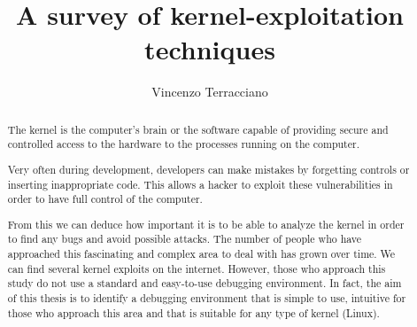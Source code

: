 \documentclass{masterthesis}
\begin{document}
\title{A survey of kernel-exploitation techniques}

\author{Vincenzo Terracciano}



\maketitle

\begin{abstract}
The kernel is the computer’s brain or the software capable of providing secure and controlled access to the hardware to the processes running on the computer.

Very often during development, developers can make mistakes by forgetting controls or inserting inappropriate code. This allows a hacker to exploit these vulnerabilities in order to have full control of the computer.

From this we can deduce how important it is to be able to analyze the kernel in order to find any bugs and avoid possible attacks. The number of people who have approached this fascinating and complex area to deal with has grown over time. We can find several kernel exploits on the internet. However, those who approach this study do not use a standard and easy-to-use debugging environment.
In fact, the aim of this thesis is to identify a debugging environment that is simple to use, intuitive for those who approach this area and that is suitable for any type of kernel (Linux).



\end{abstract}
\end{document}
